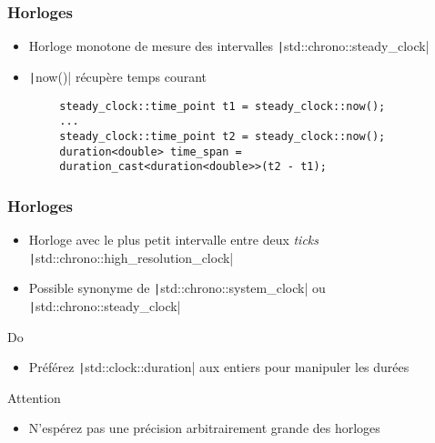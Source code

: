 \documentclass[C++.tex]{subfiles}
\begin{document}
\begin{frame}[fragile]
	\frametitle{Horloges}
	\begin{itemize}
		\item Horloge monotone de mesure des intervalles \texttt|std::chrono::steady_clock|


		\item \texttt|now()| récupère temps courant
	\end{itemize}

	\begin{verbatim}
		steady_clock::time_point t1 = steady_clock::now();
		...
		steady_clock::time_point t2 = steady_clock::now();
		duration<double> time_span = 
		duration_cast<duration<double>>(t2 - t1);
	\end{verbatim}
\end{frame}

\begin{frame}[fragile]
	\frametitle{Horloges}
	\begin{itemize}
		\item Horloge avec le plus petit intervalle entre deux \textit{ticks} \texttt|std::chrono::high_resolution_clock| 
		\item Possible synonyme de \texttt|std::chrono::system_clock| ou \texttt|std::chrono::steady_clock|
	\end{itemize}

	\begin{exampleblock}{Do}
		\begin{itemize}
			\item Préférez \texttt|std::clock::duration| aux entiers pour manipuler les durées
		\end{itemize}

	\end{exampleblock}

	\begin{alertblock}{Attention}
		\begin{itemize}
			\item N'espérez pas une précision arbitrairement grande des horloges
		\end{itemize}

	\end{alertblock}
\end{frame}
\end{document}
